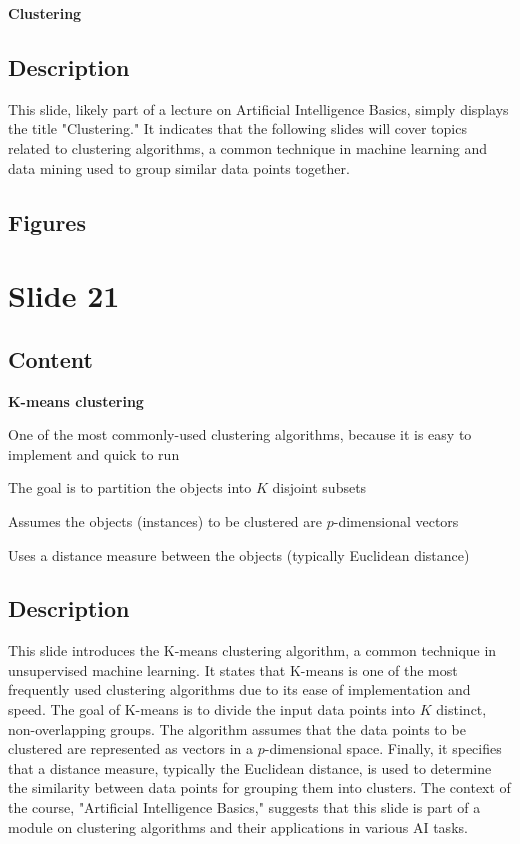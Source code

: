 \documentclass{article}%
\begin{document}
\textbf{Clustering}
%
\subsection{Description}%
This slide, likely part of a lecture on Artificial Intelligence Basics, simply displays the title "Clustering."  It indicates that the following slides will cover topics related to clustering algorithms, a common technique in machine learning and data mining used to group similar data points together.%
\subsection{Figures}%
\begin{figure}[H]%
\centering%
\end{figure}

%
\newpage%
\section{Slide 21}%
\label{sec:Slide21}%
\subsection{Content}%

\textbf{K-means clustering}

One of the most commonly-used clustering algorithms, because it is easy to implement
and quick to run

The goal is to partition the objects into $K$ disjoint subsets

Assumes the objects (instances) to be clustered are $p$-dimensional vectors

Uses a distance measure between the objects (typically Euclidean distance)
%
\subsection{Description}%
This slide introduces the K-means clustering algorithm, a common technique in unsupervised machine learning.  It states that K-means is one of the most frequently used clustering algorithms due to its ease of implementation and speed.  The goal of K-means is to divide the input data points into $K$ distinct, non-overlapping groups.  The algorithm assumes that the data points to be clustered are represented as vectors in a $p$-dimensional space.  Finally, it specifies that a distance measure, typically the Euclidean distance, is used to determine the similarity between data points for grouping them into clusters.  The context of the course, "Artificial Intelligence Basics," suggests that this slide is part of a module on clustering algorithms and their applications in various AI tasks.%
\end{document}
